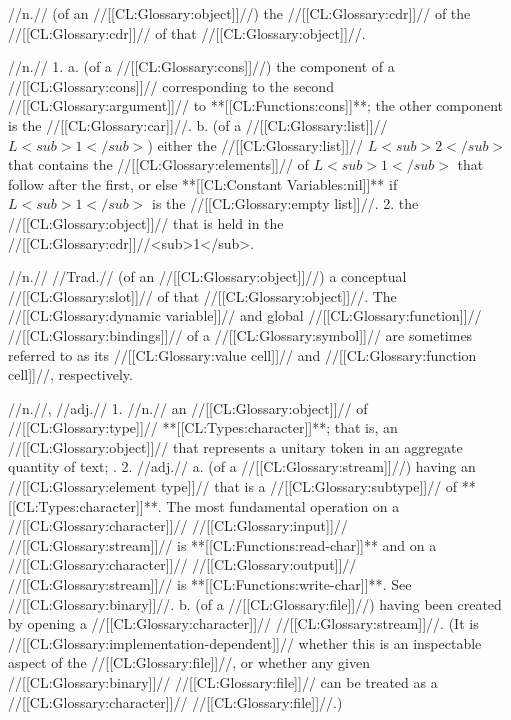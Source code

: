  //n.// (of an //[[CL:Glossary:object]]//) the //[[CL:Glossary:cdr]]// of the //[[CL:Glossary:cdr]]// of that //[[CL:Glossary:object]]//.

 //n.// 1. a. (of a //[[CL:Glossary:cons]]//) the component of a //[[CL:Glossary:cons]]// corresponding to the second //[[CL:Glossary:argument]]// to **[[CL:Functions:cons]]**; the other component is the //[[CL:Glossary:car]]//.  b. (of a //[[CL:Glossary:list]]// $L<sub>1</sub>$) either the //[[CL:Glossary:list]]// $L<sub>2</sub>$ that contains the //[[CL:Glossary:elements]]// of $L<sub>1</sub>$ that follow after the first, or else **[[CL:Constant Variables:nil]]** if $L<sub>1</sub>$ is the //[[CL:Glossary:empty list]]//. 2. the //[[CL:Glossary:object]]// that is held in the //[[CL:Glossary:cdr]]//<sub>1</sub>. 

 //n.// //Trad.// (of an //[[CL:Glossary:object]]//) a conceptual //[[CL:Glossary:slot]]// of that //[[CL:Glossary:object]]//. The //[[CL:Glossary:dynamic variable]]// and global //[[CL:Glossary:function]]// //[[CL:Glossary:bindings]]// of a //[[CL:Glossary:symbol]]// are sometimes referred to as its //[[CL:Glossary:value cell]]// and //[[CL:Glossary:function cell]]//, respectively.

 //n.//, //adj.// 1. //n.// an //[[CL:Glossary:object]]// of //[[CL:Glossary:type]]// **[[CL:Types:character]]**; that is, an //[[CL:Glossary:object]]// that represents a unitary token in an aggregate quantity of text; \seesection\CharacterConcepts. 2. //adj.// a. (of a //[[CL:Glossary:stream]]//) having an //[[CL:Glossary:element type]]// that is a //[[CL:Glossary:subtype]]// of **[[CL:Types:character]]**. The most fundamental operation on a //[[CL:Glossary:character]]// //[[CL:Glossary:input]]// //[[CL:Glossary:stream]]// is **[[CL:Functions:read-char]]** and on a //[[CL:Glossary:character]]// //[[CL:Glossary:output]]// //[[CL:Glossary:stream]]// is **[[CL:Functions:write-char]]**. See //[[CL:Glossary:binary]]//. b. (of a //[[CL:Glossary:file]]//) having been created by opening a //[[CL:Glossary:character]]// //[[CL:Glossary:stream]]//. (It is //[[CL:Glossary:implementation-dependent]]// whether this is an inspectable aspect of the //[[CL:Glossary:file]]//, or whether any given //[[CL:Glossary:binary]]// //[[CL:Glossary:file]]// can be treated as a //[[CL:Glossary:character]]// //[[CL:Glossary:file]]//.)

